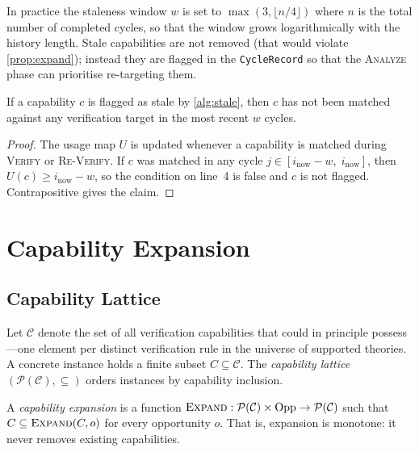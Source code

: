 \documentclass[11pt]{article}
\newcommand{\Verify}{\textsc{Verify}}
\newcommand{\Analyze}{\textsc{Analyze}}
\newcommand{\ReVerify}{\textsc{Re-Verify}}
\newcommand{\Expand}{\textsc{Expand}}
\begin{document}
\noindent
In practice the staleness window $w$ is set to $\max(3, \lfloor n/4 \rfloor)$
where $n$ is the total number of completed cycles, so that the window grows
logarithmically with the history length.  Stale capabilities are not removed
(that would violate \cref{prop:expand}); instead they are flagged in the
\texttt{CycleRecord} so that the \Analyze{} phase can prioritise re-targeting
them.

\begin{proposition}\label{prop:stale}
If a capability $c$ is flagged as stale by \cref{alg:stale}, then $c$ has
not been matched against any verification target in the most recent $w$
cycles.
\end{proposition}
\begin{proof}
The usage map $U$ is updated whenever a capability is matched during
\Verify{} or \ReVerify{}.  If $c$ was matched in any cycle
$j \in [i_{\mathrm{now}} - w,\; i_{\mathrm{now}}]$, then
$U(c) \geq i_{\mathrm{now}} - w$, so the condition on line~4 is false and
$c$ is not flagged.  Contrapositive gives the claim.
\end{proof}

\section{Capability Expansion}\label{sec:capability}

\subsection{Capability Lattice}

Let $\mathcal{C}$ denote the set of all verification capabilities that
\JuGeo{} could in principle possess—one element per distinct verification
rule in the universe of supported theories.  A concrete \JuGeo{} instance
holds a finite subset $C \subseteq \mathcal{C}$.  The \emph{capability
lattice} $(\mathcal{P}(\mathcal{C}), \subseteq)$ orders instances by
capability inclusion.

\begin{definition}\label{def:expand}
A \emph{capability expansion} is a function
$\Expand : \mathcal{P}(\mathcal{C}) \times \mathrm{Opp}
         \to \mathcal{P}(\mathcal{C})$
such that $C \subseteq \Expand(C, o)$ for every opportunity $o$.
That is, expansion is monotone: it never removes existing capabilities.
\end{definition}
\end{document}
